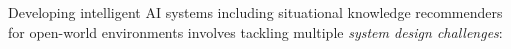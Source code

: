 Developing intelligent AI systems including situational knowledge recommenders for open-world environments involves tackling multiple \textit{system design challenges}:
\begin{enumerate*}[label=\\\textbf{(\arabic*)}]%
    \item 
    
    \item 
    
    \item 
    
\end{enumerate*}
